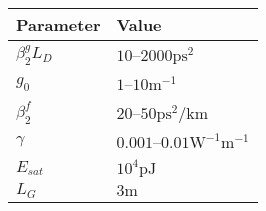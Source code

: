 \documentclass[12pt]{article}
\newcommand{\Es}{E_{sat}}
\begin{document}
\begin{table}
\begin{tabular}{|l|l|}
\hline
Parameter & Value \\
\hline
$\beta_2^g L_D$ & $10$--$2000 \text{ps}^2$ \\
$g_0$ & $1$--$10 \text{m}^{-1}$ \\
$\beta_2^f$ & $20$--$50 \text{ps}^2/ \text{km}$ \\
$\gamma$ & $0.001$--$0.01 \text{W}^{-1} \text{m}^{-1}$ \\
$\Es$ & $10^4 \text{pJ}$ \\
$L_G$ & $3 \text{m}$ \\
\hline
\end{tabular}
\end{table}


\newpage
\printbibliography
\end{document}

